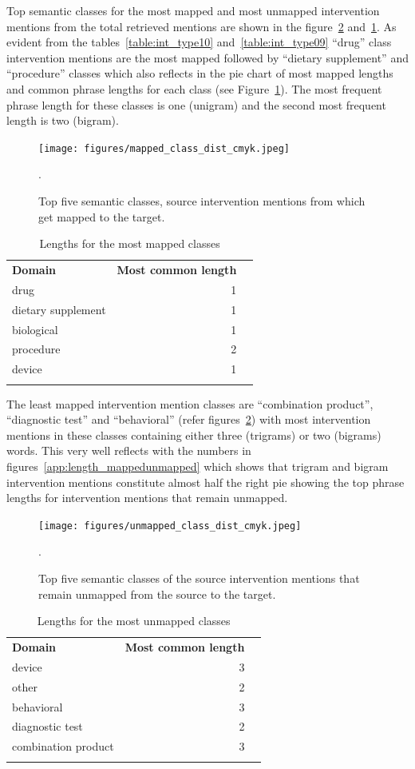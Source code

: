 \documentclass[11pt]{article}
\begin{document}
Top semantic classes for the most mapped and most unmapped intervention mentions from the total retrieved mentions are shown in the figure~\ref{app:unmapped_class_dist} and~\ref{app:mapped_class_dist}.
As evident from the tables~\ref{table:int_type10} and~\ref{table:int_type09} ``drug'' class intervention mentions are the most mapped followed by ``dietary supplement'' and ``procedure'' classes which also reflects in the pie chart of most mapped lengths and common phrase lengths for each class (see Figure~\ref{app:mapped_class_dist}).
The most frequent phrase length for these classes is one (unigram) and the second most frequent length is two (bigram).
%
\begin{figure}[hbt!]
\centering
\texttt{[image: figures/mapped\_class\_dist\_cmyk.jpeg]}
\caption{Top five semantic classes, source intervention mentions from which get mapped to the target.}.
\label{app:mapped_class_dist}
\end{figure}
%
\begin{table}[!htbp]
\centering
\begin{tabular}{lrl}
\Xhline{1pt} \textbf{Domain} & \textbf{ Most common length } \\ \Xhline{1pt}
drug & 1 \\
dietary supplement & 1 \\
biological & 1 \\
procedure & 2 \\
device & 1 \\
\Xhline{1pt}
\end{tabular}
\caption{Lengths for the most mapped classes}
\label{table:len_mapped_classes} 
\end{table}
%
%
The least mapped intervention mention classes are ``combination product'', ``diagnostic test'' and ``behavioral'' (refer figures~\ref{app:unmapped_class_dist}) with most intervention mentions in these classes containing either three (trigrams) or two (bigrams) words.
This very well reflects with the numbers in figures~\ref{app:length_mappedunmapped} which shows that trigram and bigram intervention mentions constitute almost half the right pie showing the top phrase lengths for intervention mentions that remain unmapped.
%
\begin{figure}[hbt!]
\centering
\texttt{[image: figures/unmapped\_class\_dist\_cmyk.jpeg]}
\caption{Top five semantic classes of the source intervention mentions that remain unmapped from the source to the target.}.
\label{app:unmapped_class_dist}
\end{figure}
%
\begin{table}[!htbp]
\centering
\begin{tabular}{lrl}
\Xhline{1pt} \textbf{Domain} & \textbf{ Most common length } \\ \Xhline{1pt}
device & 3 \\
other & 2 \\
behavioral & 3 \\
diagnostic test & 2 \\
combination product & 3 \\
\Xhline{1pt}
\end{tabular}
\caption{Lengths for the most unmapped classes}
\label{table:len_unmapped_classes} 
\end{table}
\end{document}
